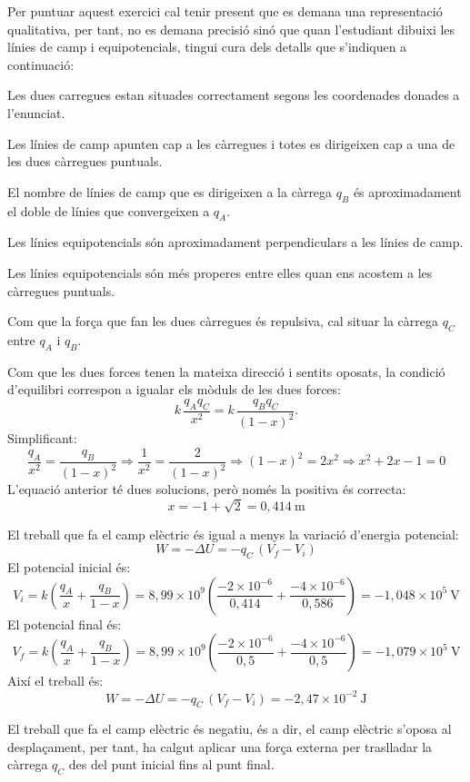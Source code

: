 \begin{solapartat}
Per puntuar aquest exercici cal tenir present que es demana una representació qualitativa, per tant, no es demana precisió sinó que quan l'estudiant dibuixi les línies de camp i equipotencials, tingui cura dels detalls que s'indiquen a continuació:

 Les dues carregues estan situades correctament segons les coordenades donades a l'enunciat.

 Les línies de camp apunten cap a les càrregues i totes es dirigeixen cap a una de les dues càrregues puntuals.

 El nombre de línies de camp que es dirigeixen a la càrrega $q_B$ és aproximadament el doble de línies que convergeixen a $q_A$.

 Les línies equipotencials són aproximadament perpendiculars a les línies de camp.

 Les línies equipotencials són més properes entre elles quan ens acostem a les càrregues puntuals.

\end{solapartat}

\begin{solapartat}
 Com que la força que fan les dues càrregues és repulsiva, cal situar la càrrega $q_C$ entre $q_A$ i $q_B$.


Com que les dues forces tenen la mateixa direcció i sentits oposats, la condició d'equilibri correspon a igualar els mòduls de les dues forces:
\[ k\,\frac{q_A q_C}{x^2} = k\,\frac{q_B q_C}{(1-x)^2}. \]
Simplificant:
\[ \frac{q_A}{x^2} = \frac{q_B}{(1-x)^2} \Rightarrow \frac{1}{x^2} = \frac{2}{(1-x)^2} \Rightarrow (1-x)^2 = 2x^2 \Rightarrow x^2 + 2x - 1 = 0 \]
L'equació anterior té dues solucions, però només la positiva és correcta:
\[ x = -1 + \sqrt{2} = 0,414\ \mathrm{m} \]

 El treball que fa el camp elèctric és igual a menys la variació d'energia potencial:
\[ W = -\Delta U = -q_C\,(V_f - V_i) \]
El potencial inicial és:
\[ V_i = k\left(\frac{q_A}{x} + \frac{q_B}{1-x}\right) = 8,99\times 10^{9}\left(\frac{-2\times 10^{-6}}{0,414} + \frac{-4\times 10^{-6}}{0,586}\right) = -1,048\times 10^{5}\ \mathrm{V} \]
El potencial final és:
\[ V_f = k\left(\frac{q_A}{x} + \frac{q_B}{1-x}\right) = 8,99\times 10^{9}\left(\frac{-2\times 10^{-6}}{0,5} + \frac{-4\times 10^{-6}}{0,5}\right) = -1,079\times 10^{5}\ \mathrm{V} \]
Així el treball és:
\[ W = -\Delta U = -q_C\,(V_f - V_i) = -2,47\times 10^{-2}\ \mathrm{J} \]

 El treball que fa el camp elèctric és negatiu, és a dir, el camp elèctric s'oposa al desplaçament, per tant, ha calgut aplicar una força externa per traslladar la càrrega $q_C$ des del punt inicial fins al punt final.
\end{solapartat}
